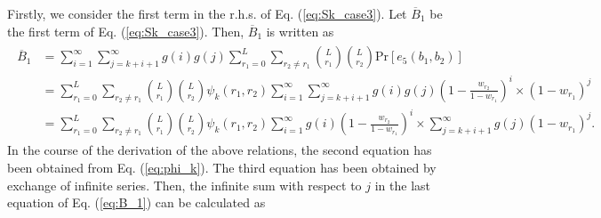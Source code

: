 %
Firstly, we consider the first term in the r.h.s. of Eq. (\ref{eq:Sk_case3}). Let $\overline{B}_1$ be the first term of Eq. (\ref{eq:Sk_case3}). Then, $\overline{B}_1$ is written as
\begin{align}\begin{split}\label{eq:B_1}
  \overline{B}_1
  &=\sum_{i=1}^{\infty}\sum_{j=k+i+1}^{\infty} g(i)g(j) \sum_{r_1=0}^{L} \sum_{r_2 \neq r_1} \binom{L}{r_1}\binom{L}{r_2}\mathrm{Pr}[e_5(b_1,b_2)] \\
  &=\sum_{r_1=0}^{L} \sum_{r_2 \neq r_1} \binom{L}{r_1}\binom{L}{r_2}\psi_k(r_1,r_2)
  \sum_{i=1}^{\infty} \sum_{j=k+i+1}^{\infty} g(i)g(j) \left(1-\frac{w_{r_2}}{1-w_{r_1}} \right)^{i} \times (1-w_{r_1})^j \\
  &=\sum_{r_1=0}^{L} \sum_{r_2 \neq r_1} \binom{L}{r_1}\binom{L}{r_2}\psi_k(r_1,r_2)
  \sum_{i=1}^{\infty} g(i)\left(1-\frac{w_{r_2}}{1-w_{r_1}} \right)^{i} \times \sum_{j=k+i+1}^{\infty} g(j) (1-w_{r_1})^j.
\end{split}\end{align}
In the course of the derivation of the above relations, the second equation has been obtained from Eq. (\ref{eq:phi_k}). The third equation has been obtained by exchange of infinite series.
%
Then, the infinite sum with respect to $j$ in the last equation of Eq. (\ref{eq:B_1}) can be calculated as
